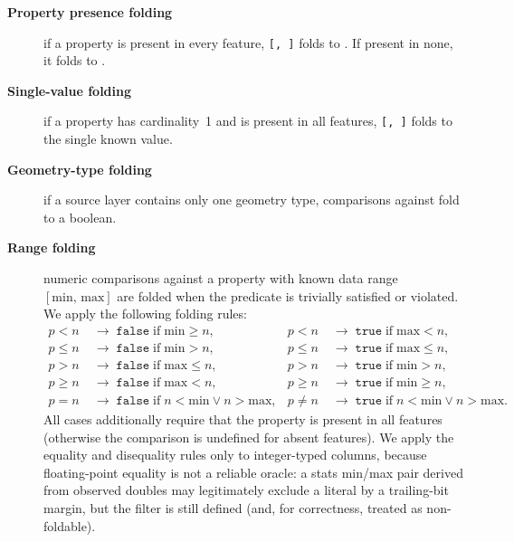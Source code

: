\begin{description}
    \item[\textbf{Property presence folding}] if a property is present in every feature, \texttt{[,~]} folds to .
If present in none, it folds to .
    \item[\textbf{Single-value folding}] if a property has cardinality~1 and is present in all features, \texttt{[,~]} folds to the single known value.
    \item[\textbf{Geometry-type folding}] if a source layer contains only one geometry type, comparisons against  fold to a boolean.
    \item[\textbf{Range folding}] numeric comparisons against a property with known data range $[\mathrm{min},\, \mathrm{max}]$ are folded when the predicate is trivially satisfied or violated.
    We apply the following folding rules:
    \begin{equation}\label{eq:range_folding}
    \begin{aligned}
        p < n  &\;\to\; \mathtt{false} \;\text{if}\; \mathrm{min} \geq n, &
        p < n  &\;\to\; \mathtt{true}  \;\text{if}\; \mathrm{max} < n, \\
        p \leq n &\;\to\; \mathtt{false} \;\text{if}\; \mathrm{min} > n, &
        p \leq n &\;\to\; \mathtt{true}  \;\text{if}\; \mathrm{max} \leq n, \\
        p > n  &\;\to\; \mathtt{false} \;\text{if}\; \mathrm{max} \leq n, &
        p > n  &\;\to\; \mathtt{true}  \;\text{if}\; \mathrm{min} > n, \\
        p \geq n &\;\to\; \mathtt{false} \;\text{if}\; \mathrm{max} < n, &
        p \geq n &\;\to\; \mathtt{true}  \;\text{if}\; \mathrm{min} \geq n, \\
        p = n  &\;\to\; \mathtt{false} \;\text{if}\; n < \mathrm{min} \lor n > \mathrm{max}, &
        p \neq n &\;\to\; \mathtt{true}  \;\text{if}\; n < \mathrm{min} \lor n > \mathrm{max}.
    \end{aligned}
    \end{equation}
    All cases additionally require that the property is present in all features (otherwise the comparison is undefined for absent features).
    We apply the equality and disequality rules only to integer-typed columns, because floating-point equality is not a reliable oracle: a stats min/max pair derived from observed doubles may legitimately exclude a literal by a trailing-bit margin, but the filter is still defined (and, for correctness, treated as non-foldable).

\end{description}
